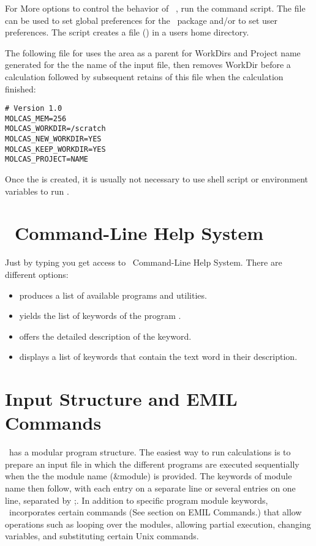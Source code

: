For More options to control the behavior of \molcas\ , run the command  script.
The file  can be used to set global preferences for the \molcas\ package and/or to set user preferences.
The  script creates a  file () in a users home directory.

The following  file for uses the  area as a parent for WorkDirs and
Project name generated for the the name of the input file,
then removes WorkDir before a calculation followed by subsequent
retains of this file when the calculation finished:
\begin{verbatim}
# Version 1.0
MOLCAS_MEM=256
MOLCAS_WORKDIR=/scratch
MOLCAS_NEW_WORKDIR=YES
MOLCAS_KEEP_WORKDIR=YES
MOLCAS_PROJECT=NAME
\end{verbatim}
Once the  is created, it is usually not necessary to use shell script or environment variables to run \molcas .

\section{\molcas\ Command-Line Help System}

Just by typing  you get access to \molcas\ Command-Line
Help System. There are different options:

\begin{itemize}
\item{ produces a list of available programs and utilities.}
\item{ yields the list of keywords of the program .}
\item{ offers the detailed description of the keyword.}
\item{ displays a list of keywords that contain the text word
in their description.}
\end{itemize}

\section{Input Structure and EMIL Commands}

\molcas\ has a modular program structure. The easiest way to run calculations
is to prepare an input file in which the different programs are executed
sequentially when the the module name (\&module) is provided. The
keywords of module name then follow, with each entry on a separate line or
several entries on one line, separated by ;.
In addition to specific program module keywords, \molcas\
incorporates certain commands (See section on EMIL Commands.) that allow
operations such as looping over the modules, allowing partial execution,
changing variables, and substituting certain Unix commands.

